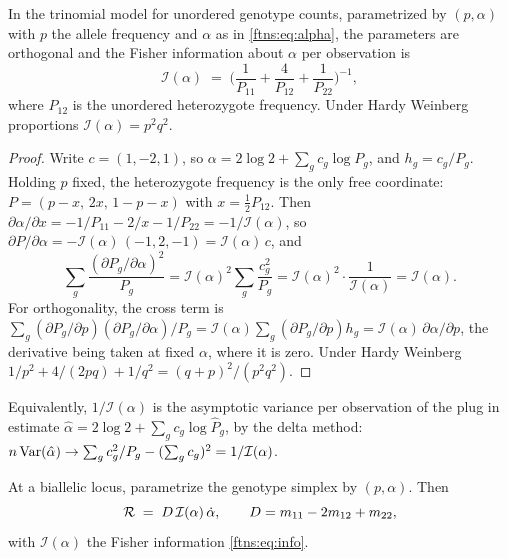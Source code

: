 \begin{lemma}
\label{ftns:lem:info}
In the trinomial model for unordered genotype counts, parametrized by $(p,\alpha)$ with $p$ the
allele frequency and $\alpha$ as in \eqref{ftns:eq:alpha}, the parameters are orthogonal and the
Fisher information about $\alpha$ per observation is
\begin{equation}
\mathcal{I}(\alpha)\;=\;\Big(\frac{1}{P_{11}}+\frac{4}{P_{12}}+\frac{1}{P_{22}}\Big)^{-1},
\label{ftns:eq:info}
\end{equation}
where $P_{12}$ is the unordered heterozygote frequency. Under Hardy Weinberg proportions
$\mathcal{I}(\alpha)=p^2q^2$.
\end{lemma}

\begin{proof}
Write $c=(1,-2,1)$, so $\alpha=2\log2+\sum_gc_g\log P_g$, and $h_g=c_g/P_g$. Holding $p$ fixed, the
heterozygote frequency is the only free coordinate: $P=(p-x,\,2x,\,1-p-x)$ with $x=\tfrac12P_{12}$.
Then $\partial\alpha/\partial x=-1/P_{11}-2/x-1/P_{22}=-1/\mathcal{I}(\alpha)$, so
$\partial P/\partial\alpha=-\mathcal{I}(\alpha)\,(-1,2,-1)=\mathcal{I}(\alpha)\,c$, and
\[
\sum_g\frac{(\partial P_g/\partial\alpha)^2}{P_g}=\mathcal{I}(\alpha)^2\sum_g\frac{c_g^2}{P_g}
=\mathcal{I}(\alpha)^2\cdot\frac{1}{\mathcal{I}(\alpha)}=\mathcal{I}(\alpha).
\]
For orthogonality, the cross term is
$\sum_g(\partial P_g/\partial p)(\partial P_g/\partial\alpha)/P_g
=\mathcal{I}(\alpha)\sum_g(\partial P_g/\partial p)h_g=\mathcal{I}(\alpha)\,\partial\alpha/\partial p$,
the derivative being taken at fixed $\alpha$, where it is zero. Under Hardy Weinberg
$1/p^2+4/(2pq)+1/q^2=(q+p)^2/(p^2q^2)$.
\end{proof}

Equivalently, $1/\mathcal{I}(\alpha)$ is the asymptotic variance per observation of the plug in
estimate $\hat\alpha=2\log2+\sum_gc_g\log\hat P_g$, by the delta method:
$n\operatorname{Var}(\hat\alpha)\to\sum_gc_g^2/P_g-(\sum_gc_g)^2=1/\mathcal{I}(\alpha)$.

\begin{corollary}
\label{ftns:thm:lindley}
At a biallelic locus, parametrize the genotype simplex by $(p,\alpha)$. Then
\begin{equation}
\mathcal{R} \;=\; D\,\mathcal{I}(\alpha)\,\dot\alpha,
\qquad
D=m_{11}-2m_{12}+m_{22},
\label{ftns:eq:lindleyR}
\end{equation}
with $\mathcal{I}(\alpha)$ the Fisher information \eqref{ftns:eq:info}.
\end{corollary}

